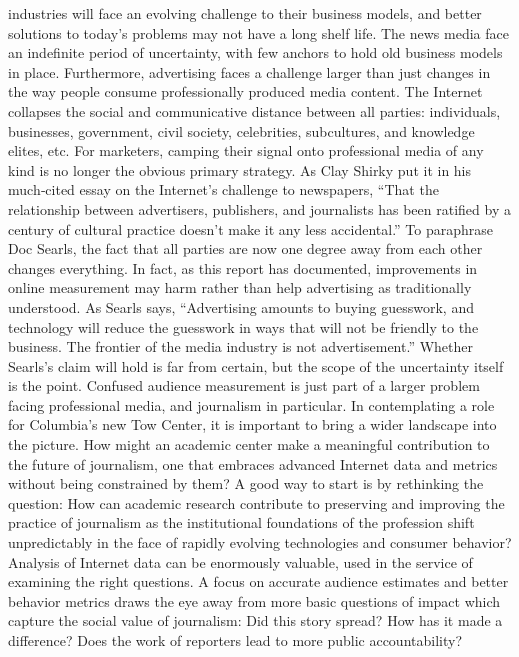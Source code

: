 industries will face an evolving challenge to their business models, and
better solutions to today’s problems may not have a long shelf life.
The news media face an indefinite period of uncertainty, with few anchors
to hold old business models in place. Furthermore, advertising faces a
challenge larger than just changes in the way people consume
professionally produced media content. The Internet collapses the social
and communicative distance between all parties: individuals, businesses,
government, civil society, celebrities, subcultures, and knowledge elites,
etc. For marketers, camping their signal onto professional media of any
kind is no longer the obvious primary strategy. As Clay Shirky put it in
his much‐cited essay on the Internet’s challenge to newspapers, ``That the
relationship between advertisers, publishers, and journalists has been
ratified by a century of cultural practice doesn’t make it any less
accidental.''
To paraphrase Doc Searls, the fact that all parties are now one degree
away from each other changes everything. In fact, as this report has
documented, improvements in online measurement may harm rather than
help advertising as traditionally understood. As Searls says, ``Advertising
amounts to buying guesswork, and technology will reduce the guesswork
in ways that will not be friendly to the business. The frontier of the media
industry is not advertisement.''
Whether Searls’s claim will hold is far from certain, but the scope of the
uncertainty itself is the point. Confused audience measurement is just part
of a larger problem facing professional media, and journalism in
particular. In contemplating a role for Columbia’s new Tow Center, it is
important to bring a wider landscape into the picture. How might an
academic center make a meaningful contribution to the future of
journalism, one that embraces advanced Internet data and metrics without
being constrained by them?
A good way to start is by rethinking the question: How can academic
research contribute to preserving and improving the practice of
journalism as the institutional foundations of the profession shift
unpredictably in the face of rapidly evolving technologies and consumer
behavior? Analysis of Internet data can be enormously valuable, used in
the service of examining the right questions.
A focus on accurate audience estimates and better behavior metrics draws
the eye away from more basic questions of impact which capture the
social value of journalism: Did this story spread? How has it made a
difference? Does the work of reporters lead to more public accountability?
